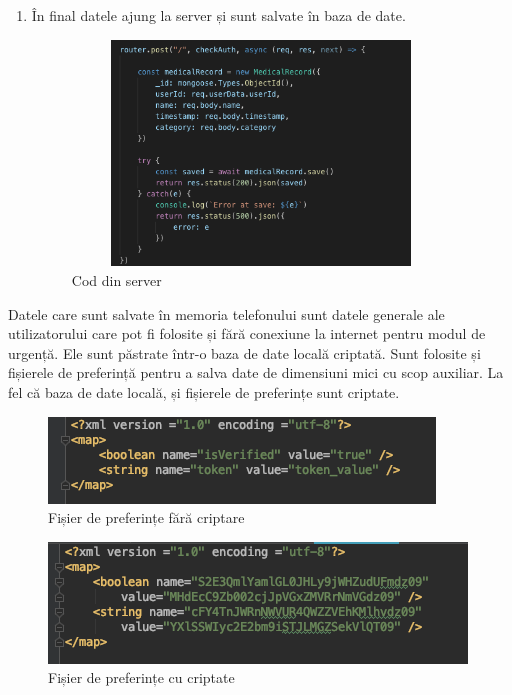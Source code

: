 \documentclass[12pt]{article}
\begin{document}
\begin{enumerate}
    \item În final datele ajung la server și sunt salvate în baza de date.
    

    \begin{figure}[H]
        \centering
        \includegraphics[width=10cm, height=6cm]{addServer.png}
        \caption{Cod din server}
        \end{figure}

\end{enumerate}

Datele care sunt salvate în memoria telefonului sunt datele generale ale utilizatorului care pot fi folosite
și fără conexiune la internet pentru modul de urgență. Ele sunt păstrate într-o baza de date locală criptată.
Sunt folosite și fișierele de preferință pentru a salva date de dimensiuni mici 
cu scop auxiliar. La fel că baza de date locală, și fișierele de preferințe sunt criptate.

\bigskip

\begin{figure}[H]
    \centering
    \includegraphics{noncript.png}
    \caption{Fișier de preferințe fără criptare}
    \end{figure}

    \begin{figure}[H]
        \centering
        \includegraphics{cript2.png}
        \caption{Fișier de preferințe cu criptate}
        \end{figure}
\end{document}

